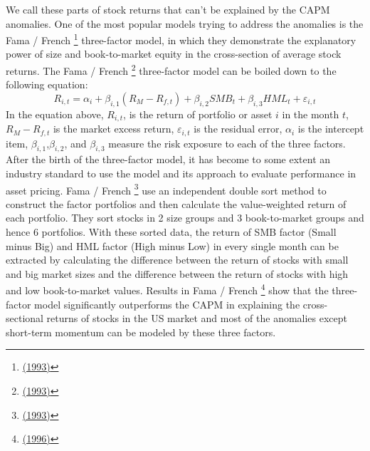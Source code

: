 \documentclass[a4paper,12pt]{article}
\begin{document}
We call these parts of stock returns that can't be explained by the CAPM anomalies. One of the most popular models trying to address the anomalies is the Fama / French \footnote{\protect\hyperlink{ref-RN66}{(1993)}} three-factor model, in which they demonstrate the explanatory power of size and book-to-market equity in the cross-section of average stock returns. The Fama / French \footnote{\protect\hyperlink{ref-RN66}{(1993)}} three-factor model can be boiled down to the following equation:
\begin{equation}
\tag{2}
R_{i,t}=\alpha_i+\beta_{i,1}\left(R_M-R_{f,t}\right)+\beta_{i,2}SMB_t+\beta_{i,3}HML_t+\varepsilon_{i,t}
\end{equation}
In the equation above, \(R_{i,t}\), is the return of portfolio or asset \(i\) in the month \(t\), \(R_M-R_{f,t}\) is the market excess return, \(\varepsilon_{i,t}\) is the residual error, \(\alpha_i\) is the intercept item, \(\beta_{i,1}\),\(\beta_{i,2}\), and \(\beta_{i,3}\) measure the risk exposure to each of the three factors. After the birth of the three-factor model, it has become to some extent an industry standard to use the model and its approach to evaluate performance in asset pricing. Fama / French \footnote{\protect\hyperlink{ref-RN66}{(1993)}} use an independent double sort method to construct the factor portfolios and then calculate the value-weighted return of each portfolio. They sort stocks in 2 size groups and 3 book-to-market groups and hence 6 portfolios. With these sorted data, the return of SMB factor (Small minus Big) and HML factor (High minus Low) in every single month can be extracted by calculating the difference between the return of stocks with small and big market sizes and the difference between the return of stocks with high and low book-to-market values. Results in Fama / French \footnote{\protect\hyperlink{ref-RN80}{(1996)}} show that the three-factor model significantly outperforms the CAPM in explaining the cross-sectional returns of stocks in the US market and most of the anomalies except short-term momentum can be modeled by these three factors.
\end{document}

